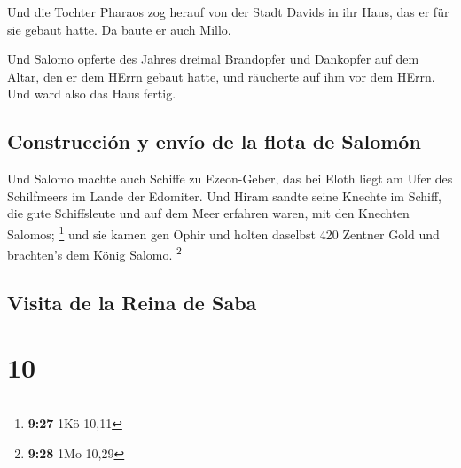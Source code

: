  Und die Tochter Pharaos zog herauf von der Stadt Davids
in ihr Haus, das er für sie gebaut hatte. Da baute er auch Millo.

 Und Salomo opferte des Jahres dreimal Brandopfer und
Dankopfer auf dem Altar, den er dem HErrn gebaut hatte, und räucherte
auf ihm vor dem HErrn. Und ward also das Haus fertig.

\hypertarget{construcciuxf3n-y-envuxedo-de-la-flota-de-salomuxf3n}{%
\subsection{Construcción y envío de la flota de
Salomón}\label{construcciuxf3n-y-envuxedo-de-la-flota-de-salomuxf3n}}

 Und Salomo machte auch Schiffe zu Ezeon-Geber, das bei
Eloth liegt am Ufer des Schilfmeers im Lande der Edomiter.
 Und Hiram sandte seine Knechte im Schiff, die gute
Schiffsleute und auf dem Meer erfahren waren, mit den Knechten Salomos;
\footnote{\textbf{9:27} 1Kö 10,11}  und sie kamen gen
Ophir und holten daselbst 420 Zentner Gold und brachten's dem König
Salomo. \footnote{\textbf{9:28} 1Mo 10,29}

\hypertarget{visita-de-la-reina-de-saba}{%
\subsection{Visita de la Reina de
Saba}\label{visita-de-la-reina-de-saba}}

\hypertarget{section-9}{%
\section{10}\label{section-9}}

